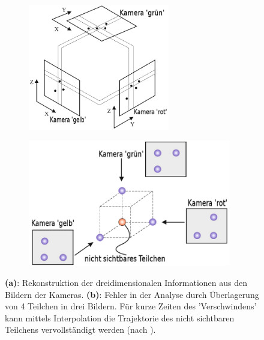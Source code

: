 \documentclass[numbers=noenddot,a4paper,notitlepage,twoside,BCOR15mm]{scrbook}
\newcommand{\tilt}[1]{\textit{#1}}
\newcommand{\fett}[1]{\textbf{#1}}
\begin{document}
            
                \begin{figure}
                    \begin{subfigure}[b]{0.4\textwidth}
                        \centering
                        \includegraphics[width=\textwidth,height=5.5cm]{figs/rekonstruktion.png}
                        \caption{}
                    \end{subfigure}
                    \begin{subfigure}[b]{0.56\textwidth}
                        \centering
                        \includegraphics[width=\textwidth,height=5.5cm]{figs/nichtsichtbar.png}
                        \caption{}
                    \end{subfigure}
                    \caption{\fett{(a)}: Rekonstruktion der dreidimensionalen Informationen aus den Bildern der Kameras. \fett{(b)}: Fehler in der Analyse durch Überlagerung von 4 Teilchen in drei Bildern. Für kurze Zeiten des 'Verschwindens' kann mittels Interpolation die Trajektorie des nicht sichtbaren Teilchens vervollständigt werden (nach \cite{Bonitz10}).}
                    \label{img:rekonstruktion}
                \end{figure}
\end{document}
